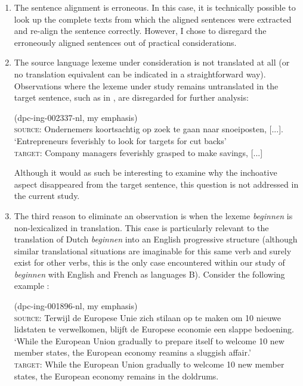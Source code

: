 \begin{enumerate}
\item The sentence alignment is erroneous. In this case, it is technically possible to look up the complete texts from which the aligned sentences were extracted and re-align the sentence correctly. However, I chose to disregard the erroneously aligned sentences out of practical considerations.
\item The source language lexeme under consideration is not translated at all (or no translation equivalent can be indicated in a straightforward way). Observations where the lexeme under study remains untranslated in the target sentence, such as in , are disregarded for further analysis:


\ea (dpc-ing-002337-nl, my emphasis)\label{ex:3:2}\\
\textsc{source:} Ondernemers  koortsachtig op zoek te gaan naar snoeiposten, [...].\\\relax
\ob`Entrepreneurs feverishly  to look for targets for cut backs'\cb\smallskip\\
\textsc{target:} Company managers feverishly grasped to make savings, [...] 
\z

Although it would as such be interesting to examine why the inchoative aspect disappeared from the target sentence, this question is not addressed in the current study.

\item The third reason to eliminate an observation is when the lexeme \textit{beginnen} is non-lexicalized in translation. This case is particularly relevant to the translation of Dutch \textit{beginnen} into an English progressive structure (although similar translational situations are imaginable for this same verb and surely exist for other verbs, this is the only case encountered within our study of \textit{beginnen} with English and French as languages B). Consider the following example :

\ea (dpc-ing-001896-nl, my emphasis)\label{ex:3:3}\\
\textsc{source:} Terwijl de Europese Unie zich stilaan  op te maken om 10 nieuwe lidstaten te verwelkomen, blijft de Europese economie een slappe bedoening.\\\relax
\ob`While the European Union  gradually to prepare itself to welcome 10 new member states, the European economy reamins a sluggish affair.'\cb\smallskip\\
\textsc{target:} While the European Union  gradually  to welcome 10 new member states, the European economy remains in the doldrums. 
\z


\end{enumerate}
